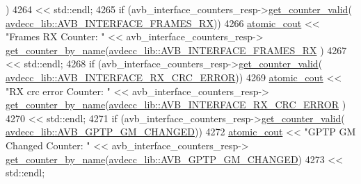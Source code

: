 \begin{DoxyCode}
      )
4264                                 << std::endl;
4265                 \textcolor{keywordflow}{if} (avb\_interface\_counters\_resp->\hyperlink{classavdecc__lib_1_1avb__counters__response_a1a714d004a3ca8b521311ba4d3e62e93}{get\_counter\_valid}(
      \hyperlink{namespaceavdecc__lib_a831be56dba8ac423258a9374a1202df4a521047f1a79ce7b8ae4e00350d4ec081}{avdecc\_lib::AVB\_INTERFACE\_FRAMES\_RX}))
4266                     \hyperlink{cmd__line_8h_a0bc38ccc65c79ba06c6fcd7b4bf554c3}{atomic\_cout} << \textcolor{stringliteral}{"Frames RX Counter: "} << avb\_interface\_counters\_resp->
      \hyperlink{classavdecc__lib_1_1avb__counters__response_aad68050f63fc17c24527b3157d6ca8c7}{get\_counter\_by\_name}(\hyperlink{namespaceavdecc__lib_a831be56dba8ac423258a9374a1202df4a521047f1a79ce7b8ae4e00350d4ec081}{avdecc\_lib::AVB\_INTERFACE\_FRAMES\_RX}
      )
4267                                 << std::endl;
4268                 \textcolor{keywordflow}{if} (avb\_interface\_counters\_resp->\hyperlink{classavdecc__lib_1_1avb__counters__response_a1a714d004a3ca8b521311ba4d3e62e93}{get\_counter\_valid}(
      \hyperlink{namespaceavdecc__lib_a831be56dba8ac423258a9374a1202df4a605ffe6c6d52bf64afcd06550ecd1e96}{avdecc\_lib::AVB\_INTERFACE\_RX\_CRC\_ERROR}))
4269                     \hyperlink{cmd__line_8h_a0bc38ccc65c79ba06c6fcd7b4bf554c3}{atomic\_cout} << \textcolor{stringliteral}{"RX crc error Counter: "} << avb\_interface\_counters\_resp->
      \hyperlink{classavdecc__lib_1_1avb__counters__response_aad68050f63fc17c24527b3157d6ca8c7}{get\_counter\_by\_name}(\hyperlink{namespaceavdecc__lib_a831be56dba8ac423258a9374a1202df4a605ffe6c6d52bf64afcd06550ecd1e96}{avdecc\_lib::AVB\_INTERFACE\_RX\_CRC\_ERROR}
      )
4270                                 << std::endl;
4271                 \textcolor{keywordflow}{if} (avb\_interface\_counters\_resp->\hyperlink{classavdecc__lib_1_1avb__counters__response_a1a714d004a3ca8b521311ba4d3e62e93}{get\_counter\_valid}(
      \hyperlink{namespaceavdecc__lib_a831be56dba8ac423258a9374a1202df4a0267d3d1b1c33c2f0e0b58de3ef3fb94}{avdecc\_lib::AVB\_GPTP\_GM\_CHANGED}))
4272                     \hyperlink{cmd__line_8h_a0bc38ccc65c79ba06c6fcd7b4bf554c3}{atomic\_cout} << \textcolor{stringliteral}{"GPTP GM Changed Counter: "} << avb\_interface\_counters\_resp->
      \hyperlink{classavdecc__lib_1_1avb__counters__response_aad68050f63fc17c24527b3157d6ca8c7}{get\_counter\_by\_name}(\hyperlink{namespaceavdecc__lib_a831be56dba8ac423258a9374a1202df4a0267d3d1b1c33c2f0e0b58de3ef3fb94}{avdecc\_lib::AVB\_GPTP\_GM\_CHANGED})
4273                                 << std::endl;

\end{DoxyCode}
